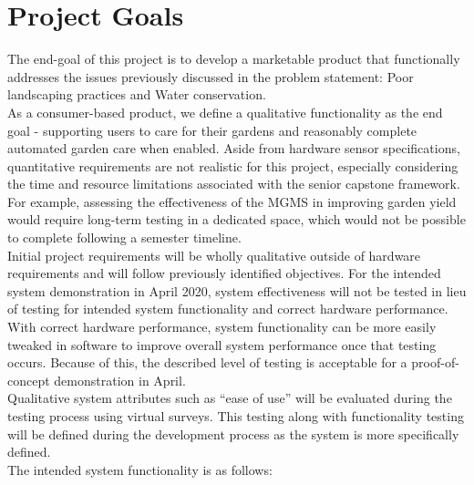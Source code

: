 \documentclass{report}
\begin{document}
\section{Project Goals}

The end-goal of this project is to develop a marketable product that functionally addresses the issues previously discussed in the problem statement: Poor landscaping practices and Water conservation.\\

As a consumer-based product, we define a qualitative functionality as the end goal - supporting users to care for their gardens and reasonably complete automated garden care when enabled. Aside from hardware sensor specifications, quantitative requirements are not realistic for this project, especially considering the time and resource limitations associated with the senior capstone framework. For example, assessing the effectiveness of the MGMS in improving garden yield would require long-term testing in a dedicated space, which would not be possible to complete following a semester timeline.\\

Initial project requirements will be wholly qualitative outside of hardware requirements and will follow previously identified objectives. For the intended system demonstration in April 2020, system effectiveness will not be tested in lieu of testing for intended system functionality and correct hardware performance. With correct hardware performance, system functionality can be more easily tweaked in software to improve overall system performance once that testing occurs. Because of this, the described level of testing is acceptable for a proof-of-concept demonstration in April.\\

Qualitative system attributes such as ``ease of use'' will be evaluated during the testing process using virtual surveys. This testing along with functionality testing will be defined during the development process as the system is more specifically defined.\\

The intended system functionality is as follows:
\end{document}
